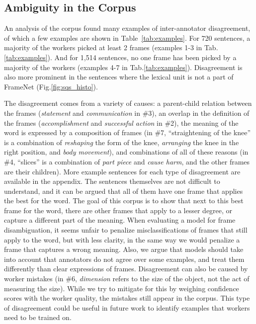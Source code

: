 \subsection{Ambiguity in the Corpus}

An analysis of the corpus found many examples of inter-annotator disagreement, of which a few examples are shown in Table~\ref{tab:examples}. For 720 sentences, a majority of the workers picked at least 2 frames (examples 1-3 in Tab.\ref{tab:examples}). And for 1,514 sentences, no one frame has been picked by a majority of the workers (examples 4-7 in Tab.\ref{tab:examples}). Disagreement is also more prominent in the sentences where the lexical unit is not a part of FrameNet (Fig.\ref{fig:sqs_histo}).

The disagreement comes from a variety of causes: a parent-child relation between the frames (\textit{statement} and \textit{communication} in \#3), an overlap in the definition of the frames (\textit{accomplishment} and \textit{successful action} in \#2), the meaning of the word is expressed by a composition of frames (in \#7, ``straightening of the knee'' is a combination of \textit{reshaping} the form of the knee, \textit{arranging} the knee in the right position, and \textit{body movement}), and combinations of all of these reasons (in \#4, ``slices'' is a combination of \textit{part piece} and \textit{cause harm}, and the other frames are their children). More example sentences for each type of disagreement are available in the appendix. The sentences themselves are not difficult to understand, and it can be argued that all of them have one frame that applies the best for the word. The goal of this corpus is to show that next to this best frame for the word, there are other frames that apply to a lesser degree, or capture a different part of the meaning. When evaluating a model for frame disambiguation, it seems unfair to penalize misclassifications of frames that still apply to the word, but with less clarity, in the same way we would penalize a frame that captures a wrong meaning. Also, we argue that models should take into account that annotators do not agree over some examples, and treat them differently than clear expressions of frames. Disagreement can also be caused by worker mistakes (in \#6, \textit{dimension} refers to the size of the object, not the act of measuring the size). While we try to mitigate for this by weighing confidence scores with the worker quality, the mistakes still appear in the corpus. This type of disagreement could be useful in future work to identify examples that workers need to be trained on.

